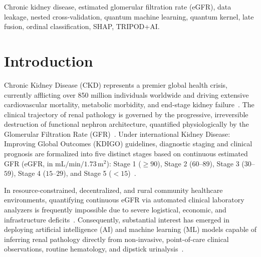 \documentclass[10pt,conference]{IEEEtran}
\begin{document}
\begin{IEEEkeywords}
Chronic kidney disease, estimated glomerular filtration rate (eGFR), data leakage, nested cross-validation, quantum machine learning, quantum kernel, late fusion, ordinal classification, SHAP, TRIPOD+AI.
\end{IEEEkeywords}

\section{Introduction}
Chronic Kidney Disease (CKD) represents a premier global health crisis, currently afflicting over 850 million individuals worldwide and driving extensive cardiovascular mortality, metabolic morbidity, and end-stage kidney failure~\cite{kdigo2013, bickbov2020global}. The clinical trajectory of renal pathology is governed by the progressive, irreversible destruction of functional nephron architecture, quantified physiologically by the Glomerular Filtration Rate (GFR)~\cite{levin2017global}. Under international Kidney Disease: Improving Global Outcomes (KDIGO) guidelines, diagnostic staging and clinical prognosis are formalized into five distinct stages based on continuous estimated GFR (eGFR, in $\text{mL/min}/1.73\,\text{m}^2$): Stage 1 ($\ge 90$), Stage 2 ($60$--$89$), Stage 3 ($30$--$59$), Stage 4 ($15$--$29$), and Stage 5 ($< 15$)~\cite{kdigo2013}.

In resource-constrained, decentralized, and rural community healthcare environments, quantifying continuous eGFR via automated clinical laboratory analyzers is frequently impossible due to severe logistical, economic, and infrastructure deficits~\cite{chen2020machine}. Consequently, substantial interest has emerged in deploying artificial intelligence (AI) and machine learning (ML) models capable of inferring renal pathology directly from non-invasive, point-of-care clinical observations, routine hematology, and dipstick urinalysis~\cite{almansour2019neural, senan2021machine, debal2022comparative}.
\end{document}

